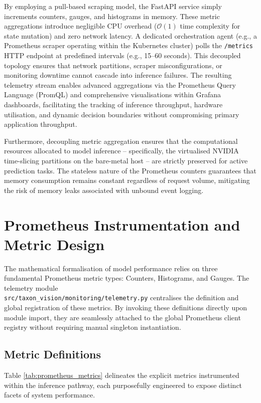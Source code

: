 By employing a pull-based scraping model, the Fast\-API service simply increments counters, gauges, and histograms in memory. These metric aggregations introduce negligible CPU overhead ($\mathcal{O}(1)$ time complexity for state mutation) and zero network latency. A dedicated orchestration agent (e.g., a Prometheus scraper operating within the Kubernetes cluster) polls the \texttt{/metrics} HTTP endpoint at predefined intervals (e.g., 15--60 seconds). This decoupled topology ensures that network partitions, scraper misconfigurations, or monitoring downtime cannot cascade into inference failures. The resulting telemetry stream enables advanced aggregations via the Prometheus Query Language (PromQL) and comprehensive visualisations within Grafana dashboards, facilitating the tracking of inference throughput, hardware utilisation, and dynamic decision boundaries without compromising primary application throughput.

Furthermore, decoupling metric aggregation ensures that the computational resources allocated to model inference -- specifically, the virtualised NVIDIA time-slicing partitions on the bare-metal host -- are strictly preserved for active prediction tasks. The stateless nature of the Prometheus counters guarantees that memory consumption remains constant regardless of request volume, mitigating the risk of memory leaks associated with unbound event logging.

\section{Prometheus Instrumentation and Metric Design}
\label{sec:prometheus_instrumentation}

The mathematical formalisation of model performance relies on three fundamental Prometheus metric types: Counters, Histograms, and Gauges. The telemetry module\\\texttt{src/taxon\_vision/monitoring/telemetry.py} centralises the definition and global registration of these metrics. By invoking these definitions directly upon module import, they are seamlessly attached to the global Prometheus client registry without requiring manual singleton instantiation.

\subsection{Metric Definitions}

Table \ref{tab:prometheus_metrics} delineates the explicit metrics instrumented within the inference pathway, each purposefully engineered to expose distinct facets of system performance.

